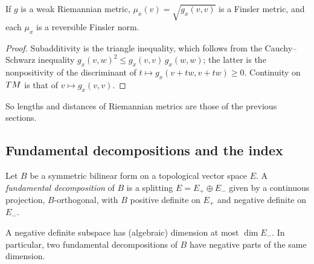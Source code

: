 \begin{theorem}
  \label{thm:mt-riemannian-finsler}
  \leanok
  If $g$ is a weak Riemannian metric, $\mu_x(v) = \sqrt{g_x(v, v)}$ is a Finsler metric, and each
  $\mu_x$ is a reversible Finsler norm.
\end{theorem}

\begin{proof}
  \leanok
  Subadditivity is the triangle inequality, which follows from the Cauchy--Schwarz inequality
  $g_x(v,w)^2 \le g_x(v,v)\,g_x(w,w)$; the latter is the nonpositivity of the discriminant of
  $t \mapsto g_x(v + t w, v + t w) \ge 0$. Continuity on $T M$ is that of $v \mapsto g_x(v,v)$.
\end{proof}

So lengths and distances of Riemannian metrics are those of the previous sections.

\subsection{Fundamental decompositions and the index}

\begin{definition}
  \label{def:fundamental-decomposition}
  \leanok
  Let $B$ be a symmetric bilinear form on a topological vector space $E$. A \emph{fundamental
  decomposition} of $B$ is a splitting $E = E_+ \oplus E_-$ given by a continuous projection,
  $B$-orthogonal, with $B$ positive definite on $E_+$ and negative definite on $E_-$.
\end{definition}

\begin{theorem}
  \label{thm:mt-index}
  \leanok
  A negative definite subspace has (algebraic) dimension at most $\dim E_-$. In particular, two
  fundamental decompositions of $B$ have negative parts of the same dimension.
\end{theorem}


